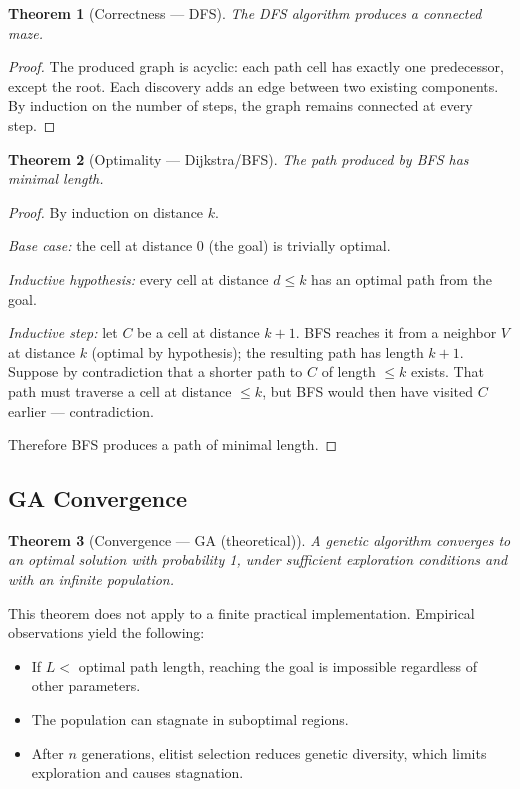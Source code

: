\documentclass[12pt, a4paper]{article}
\newtheorem{theorem}{Theorem}[section]
\theoremstyle{definition}
\begin{document}
\begin{theorem}[Correctness --- DFS]
The DFS algorithm produces a connected maze.
\end{theorem}

\begin{proof}
The produced graph is acyclic: each path cell has exactly one predecessor, except
the root. Each discovery adds an edge between two existing components. By induction
on the number of steps, the graph remains connected at every step.
\end{proof}

\begin{theorem}[Optimality --- Dijkstra/BFS]
The path produced by BFS has minimal length.
\end{theorem}

\begin{proof}
By induction on distance $k$.

\textit{Base case:} the cell at distance 0 (the goal) is trivially optimal.

\textit{Inductive hypothesis:} every cell at distance $d \leq k$ has an optimal path
from the goal.

\textit{Inductive step:} let $C$ be a cell at distance $k+1$. BFS reaches it from a
neighbor $V$ at distance $k$ (optimal by hypothesis); the resulting path has length
$k+1$.
Suppose by contradiction that a shorter path to $C$ of length $\leq k$ exists.
That path must traverse a cell at distance $\leq k$, but BFS would then have visited
$C$ earlier --- contradiction.

Therefore BFS produces a path of minimal length.
\end{proof}

\subsection{GA Convergence}

\begin{theorem}[Convergence --- GA (theoretical)]
A genetic algorithm converges to an optimal solution with probability 1, under
sufficient exploration conditions and with an infinite population.
\end{theorem}

This theorem does not apply to a finite practical implementation.
Empirical observations yield the following:

\begin{itemize}
    \item If $L <$ optimal path length, reaching the goal is impossible regardless of
          other parameters.
    \item The population can stagnate in suboptimal regions.
    \item After $n$ generations, elitist selection reduces genetic diversity, which
          limits exploration and causes stagnation.
\end{itemize}
\end{document}
